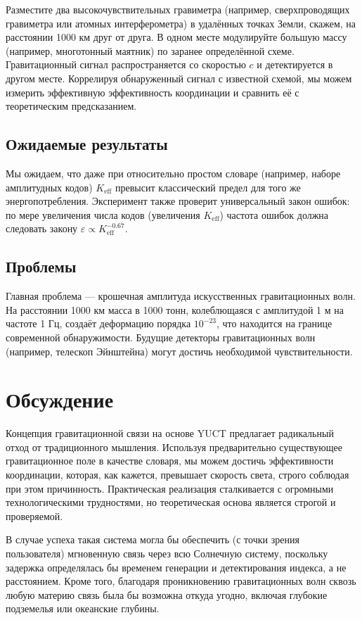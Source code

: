 \documentclass[12pt,a4paper]{article}
\newcommand{\Keff}{K_{\mathrm{eff}}}
\newcommand{\eps}{\varepsilon}
\begin{document}
	Разместите два высокочувствительных гравиметра (например, сверхпроводящих гравиметра или атомных интерферометра) в удалённых точках Земли, скажем, на расстоянии 1000 км друг от друга. В одном месте модулируйте большую массу (например, многотонный маятник) по заранее определённой схеме. Гравитационный сигнал распространяется со скоростью \(c\) и детектируется в другом месте. Коррелируя обнаруженный сигнал с известной схемой, мы можем измерить эффективную эффективность координации и сравнить её с теоретическим предсказанием.
	
	\subsection{Ожидаемые результаты}
	
	Мы ожидаем, что даже при относительно простом словаре (например, наборе амплитудных кодов) \(\Keff\) превысит классический предел для того же энергопотребления. Эксперимент также проверит универсальный закон ошибок: по мере увеличения числа кодов (увеличения \(\Keff\)) частота ошибок должна следовать закону \(\eps \propto \Keff^{-0.67}\).
	
	\subsection{Проблемы}
	
	Главная проблема — крошечная амплитуда искусственных гравитационных волн. На расстоянии 1000 км масса в 1000 тонн, колеблющаяся с амплитудой 1 м на частоте 1 Гц, создаёт деформацию порядка \(10^{-23}\), что находится на границе современной обнаружимости. Будущие детекторы гравитационных волн (например, телескоп Эйнштейна) могут достичь необходимой чувствительности.
	
	\section{Обсуждение}
	\label{sec:discussion}
	
	Концепция гравитационной связи на основе YUCT предлагает радикальный отход от традиционного мышления. Используя предварительно существующее гравитационное поле в качестве словаря, мы можем достичь эффективности координации, которая, как кажется, превышает скорость света, строго соблюдая при этом причинность. Практическая реализация сталкивается с огромными технологическими трудностями, но теоретическая основа является строгой и проверяемой.
	
	В случае успеха такая система могла бы обеспечить (с точки зрения пользователя) мгновенную связь через всю Солнечную систему, поскольку задержка определялась бы временем генерации и детектирования индекса, а не расстоянием. Кроме того, благодаря проникновению гравитационных волн сквозь любую материю связь была бы возможна откуда угодно, включая глубокие подземелья или океанские глубины.
	
\end{document}
